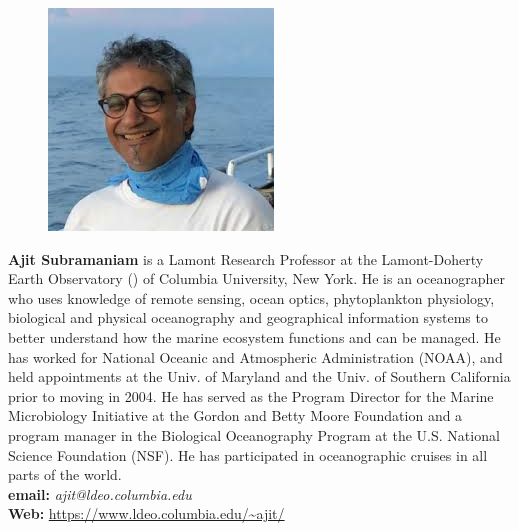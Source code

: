 \documentclass[12pt]{article}
\begin{document}
\vspace{+0.25in}
\parbox{6.25in}{
\begin{figure}
 \centering
  \includegraphics[width=.75\linewidth]{fig/ASub.jpg}
\end{figure}

\textbf{Ajit Subramaniam} is a Lamont Research Professor at the
Lamont-Doherty Earth Observatory (\ldeoe) of Columbia University, New
York.  He is an oceanographer who uses knowledge of remote sensing,
ocean optics, phytoplankton physiology, biological and physical
oceanography and geographical information systems to better understand
how the marine ecosystem functions and can be managed.  He has worked
for National Oceanic and Atmospheric Administration (NOAA), and held
appointments at the Univ. of Maryland and the Univ. of Southern
California prior to moving \ldeo in 2004. He has served as the Program
Director for the Marine Microbiology Initiative at the Gordon and
Betty Moore Foundation and a program manager in the Biological
Oceanography Program at the U.S. National Science Foundation (NSF). He
has participated in oceanographic cruises in all parts of the world.
\\
\textbf{email: }\emph{ajit@ldeo.columbia.edu} \\
\textbf{Web: }\url{https://www.ldeo.columbia.edu/~ajit/}
}
\end{document}
